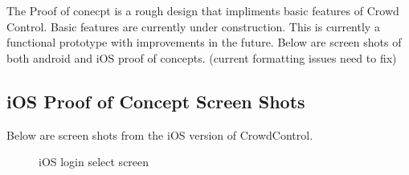 The Proof of conecpt is a rough design that impliments basic features of Crowd Control. Basic features are currently under construction. This is currently a functional prototype with improvements in the future.
\newline 
\newline
Below are screen shots of both android and iOS proof of concepts.
(current formatting issues need to fix)
\subsection{iOS Proof of Concept Screen Shots}

Below are screen shots from the iOS version of CrowdControl.


	\begin{figure}[tbh]
	\begin{center}
	\end{center}
	\caption{iOS login select screen \label{iOSloginselectscreen}}
	\end{figure}

